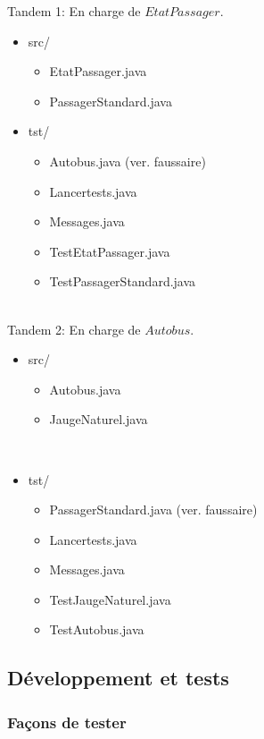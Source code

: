 \documentclass[a4paper,11pts]{article}
\begin{document}
Tandem 1: En charge de $EtatPassager$.
\begin{itemize}
\item src/
  \begin{itemize}
  \item EtatPassager.java
  \item PassagerStandard.java
  \end{itemize}

\item tst/
  \begin{itemize}
  \item Autobus.java (ver. faussaire)
  \item Lancertests.java
  \item Messages.java
  \item TestEtatPassager.java
  \item TestPassagerStandard.java
  \end{itemize}
\end{itemize}
\\
Tandem 2: En charge de $Autobus$.
\begin{itemize}
\item src/
  \begin{itemize}
  \item Autobus.java
  \item JaugeNaturel.java
  \end{itemize}\\
  
\item  tst/
  \begin{itemize}
  \item PassagerStandard.java (ver. faussaire)
  \item Lancertests.java
  \item Messages.java
  \item TestJaugeNaturel.java
  \item TestAutobus.java
  \end{itemize}
\end{itemize}



\subsection{Développement et tests}

\subsubsection{Façons de tester}
\end{document}
